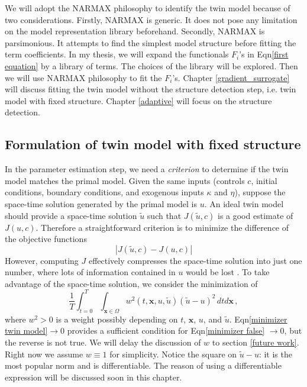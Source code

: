 \documentclass[a4paper,onecolumn]{article}
\theoremstyle{remark}
\begin{document}
\noindent 
We will adopt the NARMAX philosophy to identify the twin model because of two considerations.
Firstly, NARMAX is generic.
It does not pose any limitation on the model representation library beforehand.
Secondly, NARMAX is parsimonious.
It attempts to find the simplest model structure before fitting the term coefficients.
In my thesis,
we will expand the functionals $F_i$'s in Eqn\eqref{first equation}
by a library of terms.  The choices of the library will be explored.
Then we will use NARMAX philosophy to fit the $F_i$'s.
Chapter \ref{gradient_surrogate} will discuss fitting the twin model without the structure 
detection step, i.e. twin model with fixed structure.
Chapter \ref{adaptive} will focus on the structure detection.\\

\subsection{Formulation of twin model with fixed structure}
\label{general formulation}
\noindent In the parameter estimation step,
we need a \emph{criterion} to determine if the twin model matches the primal model.
Given the same inputs (controls $c$, initial conditions, boundary conditions, and exogenous 
inputs $\kappa$ and $\eta$), 
suppose the space-time solution generated by the primal model is $u$.
An ideal twin model should provide a space-time solution $\tilde{u}$ such that
$J(\tilde{u},c)$ is a good estimate of $J(u,c)$.
Therefore a straightforward criterion is to minimize the difference of the objective functions
\begin{equation}
    \left| J(\tilde{u},c) - J(u,c) \right|
    \label{minimizer false}
\end{equation}
However, computing $J$ effectively compresses the space-time solution into just one number,
where lots of information contained in $u$ would be lost \cite{hanmaster}.
To take advantage of the space-time solution, we consider the minimization of
\begin{equation}
    \frac{1}{T}
    \int_{t=0}^T\int_{\mathbf{x}\in\Omega} w^2(t,\mathbf{x}, u,\tilde{u}) (\tilde{u} - 
    u)^2 \, dtd\mathbf{x}\,,
    \label{minimizer twin model}
\end{equation}
where $w^2>0$ is a weight possibly depending on $t$, $\mathbf{x}$, $u$, and $\tilde{u}$.
Eqn\eqref{minimizer twin model}$
\rightarrow 0$ provides a sufficient condition for Eqn\eqref{minimizer false} $\rightarrow 0$,
but the reverse is not true.
We will delay the discussion of $w$ to section \ref{future work}.
Right now we assume $w\equiv 1$ for simplicity.
Notice the square on $\tilde{u}-u$: it is the most popular norm and is differentiable.
The reason of using a differentiable expression will be discussed soon in this chapter.\\
\end{document}
